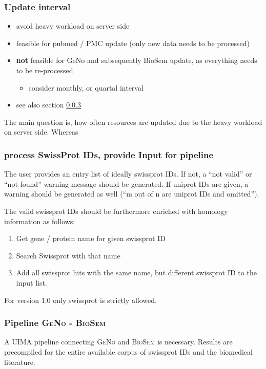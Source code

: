 \documentclass[a4paper,10pt]{article}
\begin{document}
\subsubsection{Update interval}
\begin{itemize}
 \item avoid heavy workload on server side
 \item feasible for pubmed / PMC update (only new data needs to be processed)
 \item \textbf{not} feasible for GeNo and subsequently BioSem update, as everything needs to be 
re-processed
 \begin{itemize}
  \item consider monthly, or quartal interval
 \end{itemize}
 \item see also section \ref{sec:pipeline}
\end{itemize}

The main question is, how often resources are updated due to the heavy workload on server side.
Whereas 

\subsubsection{process SwissProt IDs, provide Input for pipeline}
The user provides an entry list of ideally swissprot IDs. If not, a ``not valid'' or ``not found'' warning message should be generated. If uniprot IDs are given, a warning should be generated as well (``m out of n are uniprot IDs and omitted'').

The valid swissprot IDs should be furthermore enriched with homology information as follows:
\begin{enumerate}
 \item Get gene / protein name for given swissprot ID
 \item Search Swissprot with that name
 \item Add all swissprot hits with the same name, but different swissprot ID to the input list.
\end{enumerate}

For version 1.0 only swissprot is strictly allowed.

\subsubsection{Pipeline \textsc{GeNo} - \textsc{BioSem}} \label{sec:pipeline}

A UIMA pipeline connecting \textsc{GeNo} and \textsc{BioSem} is necessary.
Results are precompiled for the entire available corpus of swissprot IDs and the biomedical literature.
\end{document}
